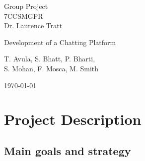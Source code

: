 \documentclass[11pt,a4paper]{article}
\begin{document}
\begin{center}
\large{Group Project\\7CCSMGPR} \\
\large{Dr. Laurence Tratt}

\bigskip

\Huge{Development of a Chatting Platform}

\bigskip

\Large{T. Avula, S. Bhatt, P. Bharti, \\S. Mohan, F. Mosca, M. Smith} \\

\bigskip

\large{\today}
\end{center}

\bigskip


\section{Project Description}
\subsection{Main goals and strategy}
\end{document}
